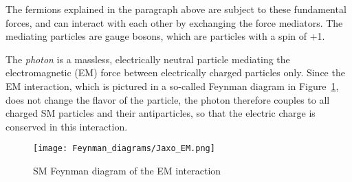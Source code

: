 The fermions explained in the paragraph above are subject to these fundamental forces, and can interact with each other by exchanging the force mediators.
The mediating particles are gauge bosons, which are particles with a spin of +1.

\begin{minipage}{0.55\textwidth}
The \textit{photon} is a massless, electrically neutral particle mediating the electromagnetic (EM) force between electrically charged particles only.
Since the EM interaction, which is pictured in a so-called Feynman diagram in Figure~\ref{fig:Feynman:EM}, does not change the flavor of the particle, the photon therefore couples to all charged SM particles and their antiparticles, so that the electric charge is conserved in this interaction.
\end{minipage} \hfill
\begin{minipage}{0.4\textwidth}
\centering
\begin{figure}[H]\centering
\texttt{[image: Feynman\_diagrams/Jaxo\_EM.png]}
\caption{SM Feynman diagram of the EM interaction}
\label{fig:Feynman:EM} 
\end{figure}
\end{minipage}


